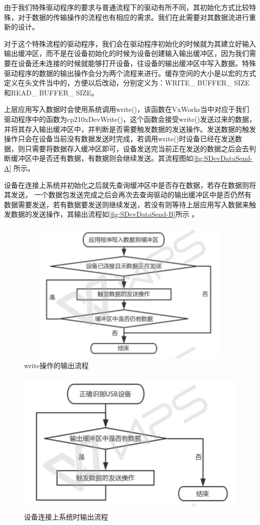 由于我们特殊驱动程序的要求与普通流程下的驱动有所不同，其初始化方式比较特殊，对于数据的传输操作的流程也有相应的需求。我们在此需要对其数据流进行重新的设计。
	
	对于这个特殊流程的驱动程序，我们会在驱动程序初始化的时候就为其建立好输入输出缓冲区，而不是在设备初始化的时候为设备创建输入输出缓冲区，因为我们需要在设备还未连接的时候就能够打开设备，往设备的输出缓冲区中写入数据。特殊驱动程序的数据的输出操作会分为两个流程来进行。缓存空间的大小是以宏的方式定义在头文件当中的，方便以后改动，分别定义为：WRITE\_ BUFFER\_ SIZE和READ\_ BUFFER\_ SIZE。
	
	上层应用写入数据时会使用系统调用write()，该函数在VxWorks当中对应于我们驱动程序中的函数为cp210xDevWrite()，这个函数会接受write()发送过来的数据，并将其存入输出缓冲区中，并判断是否需要触发数据的发送操作。发送数据的触发操作只会在设备当前没有数据发送时完成，若调用write()时设备已经在发送数据，则只需要将数据存入缓冲区即可，设备发送完当前正在发送的数据之后会去判断缓冲区中是否还有数据，有数据则会继续发送。其流程图如\autoref{fig:SDevDataSend-A} 所示。

	
	设备在连接上系统并初始化之后就先查询缓冲区中是否存在数据，若存在数据则将其发送，
	一个数据包发送完成之后会再次去查询驱动的输出缓冲区中是否仍然有数据需要发送，若有数据要发送则继续发送，若没有则等待上层应用写入数据来触发数据的发送操作，其输出流程如\autoref{fig:SDevDataSend-B}所示 。

\begin{figure}[!h]
\centering
\includegraphics[width=12cm ,height=7cm]{./graphics/SDevDataSend-A.pdf}
\caption{write操作的输出流程}\label{fig:SDevDataSend-A}
\end{figure}

\begin{figure}[!h]
\centering
\includegraphics[width=12cm,height=7cm]{./graphics/SDevDataSend-B.pdf}
\caption{设备连接上系统时输出流程}\label{fig:SDevDataSend-B}
\end{figure}

